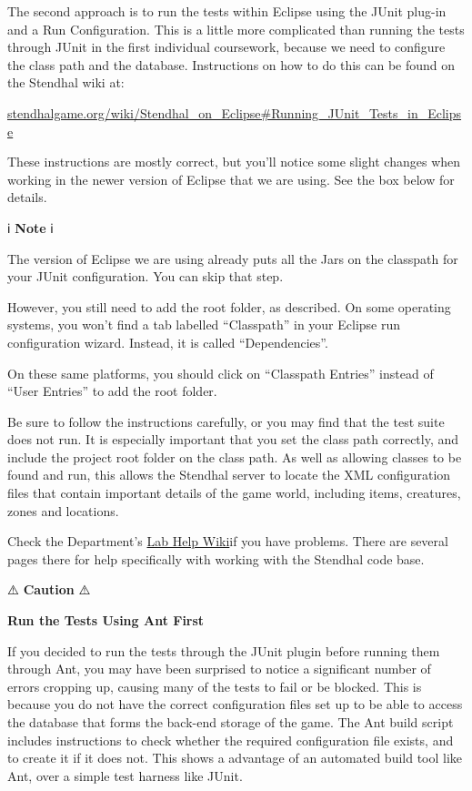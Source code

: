 \documentclass[
]{book}
\begin{document}
The second approach is to run the tests within Eclipse using the JUnit plug-in and a Run Configuration. This is a little more complicated than running the tests through JUnit in the first individual coursework, because we need to configure the class path and the database. Instructions on how to do this can be found on the Stendhal wiki at:

\href{https://stendhalgame.org/wiki/Stendhal_on_Eclipse\#Running_JUnit_Tests_in_Eclipse}{stendhalgame.org/wiki/Stendhal\_on\_Eclipse\#Running\_JUnit\_Tests\_in\_Eclipse}

These instructions are mostly correct, but you'll notice some slight changes when working in the newer version of Eclipse that we are using. See the box below for details.

ℹ️ \textbf{Note} ℹ️

The version of Eclipse we are using already puts all the Jars on the classpath for your JUnit configuration. You can skip that step.

However, you still need to add the root folder, as described. On some operating systems, you won't find a tab labelled ``Classpath'' in your Eclipse run configuration wizard. Instead, it is called ``Dependencies''.

On these same platforms, you should click on ``Classpath Entries'' instead of ``User Entries'' to add the root folder.

Be sure to follow the instructions carefully, or you may find that the test suite does not run. It is especially important that you set the class path correctly, and include the project root folder on the class path. As well as allowing classes to be found and run, this allows the Stendhal server to locate the XML configuration files that contain important details of the game world, including items, creatures, zones and locations.

Check the Department's \href{https://wiki.cs.manchester.ac.uk/index.php/LabHelp:Errors}{Lab Help Wiki}if you have problems. There are several pages there for help specifically with working with the Stendhal code base.

⚠️ \textbf{Caution} ⚠️

\textbf{Run the Tests Using Ant First}

If you decided to run the tests through the JUnit plugin before running them through Ant, you may have been surprised to notice a significant number of errors cropping up, causing many of the tests to fail or be blocked. This is because you do not have the correct configuration files set up to be able to access the database that forms the back-end storage of the game. The Ant build script includes instructions to check whether the required configuration file exists, and to create it if it does not. This shows a advantage of an automated build tool like Ant, over a simple test harness like JUnit.
\end{document}
